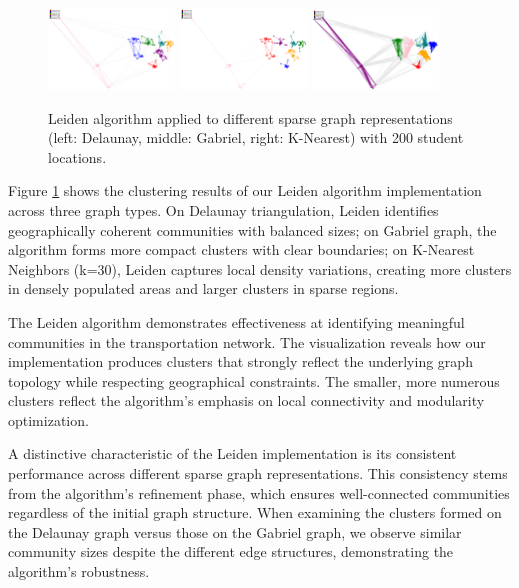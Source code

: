 \begin{figure}[htbp]
\centering
\includegraphics[width=0.3\textwidth]{./img/Leiden_Delaunay}
\hspace{0.2cm}
\includegraphics[width=0.3\textwidth]{./img/Leiden_Gabriel}
\hspace{0.2cm}
\includegraphics[width=0.3\textwidth]{./img/Leiden_K}

\caption{Leiden algorithm applied to different sparse graph representations (left: Delaunay, middle: Gabriel, right: K-Nearest) with 200 student locations.}
\label{fig:leiden_clustering}
\end{figure}

Figure \ref{fig:leiden_clustering} shows the clustering results of our Leiden algorithm implementation across three graph types. On Delaunay triangulation, Leiden identifies geographically coherent communities with balanced sizes; on Gabriel graph, the algorithm forms more compact clusters with clear boundaries; on K-Nearest Neighbors (k=30), Leiden captures local density variations, creating more clusters in densely populated areas and larger clusters in sparse regions.

The Leiden algorithm demonstrates effectiveness at identifying meaningful communities in the transportation network. The visualization reveals how our implementation produces clusters that strongly reflect the underlying graph topology while respecting geographical constraints. The smaller, more numerous clusters reflect the algorithm's emphasis on local connectivity and modularity optimization.

A distinctive characteristic of the Leiden implementation is its consistent performance across different sparse graph representations. This consistency stems from the algorithm's refinement phase, which ensures well-connected communities regardless of the initial graph structure. When examining the clusters formed on the Delaunay graph versus those on the Gabriel graph, we observe similar community sizes despite the different edge structures, demonstrating the algorithm's robustness.

